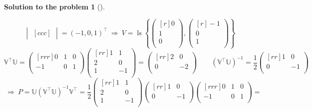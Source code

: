 \documentclass[12pt,a4]{article}
\newtheorem{solution}{Solution to the problem}
\newcommand\ls{\operatorname{ls}}
\newcommand{\bU}{{\mathbb U}}
\newcommand{\bV}{{\mathbb V}}
\begin{document}
{\begin{solution}[]
\begin{enumerate}[(a)]
\[\begin{vmatrix}[ccc]
\end{vmatrix} =
( -1, 0, 1)^\top
~\Rightarrow~ 
V = 
\ls \left \{
\begin{pmatrix}[r]
0\\ 1\\ 0\\
\end{pmatrix},
\begin{pmatrix}[r]
-1 \\ 0 \\ 1 \\
\end{pmatrix}
\right\}
\]
\[
\bV^\top\bU = 
\begin{pmatrix}[rrr]
0 & 1 & 0 \\
-1 & 0 & 1\\
\end{pmatrix}
\begin{pmatrix}[rr]
1 & 1 \\
2 & 0 \\
1 & -1 \\
\end{pmatrix}
= 
\begin{pmatrix}[rr]
2 & 0 \\
0 & -2 \\
\end{pmatrix}
\qquad
(\bV^\top\bU)^{-1} = \frac12
\begin{pmatrix}[rr]
1 & 0 \\
0 & -1 \\
\end{pmatrix}
\]
\[
~ \Rightarrow ~
P = \bU (\bV^\top\bU)^{-1}\bV^\top = \frac12
\begin{pmatrix}[rr]
1 & 1 \\
2 & 0 \\
1 & -1 \\
\end{pmatrix}
\begin{pmatrix}[rr]
1 & 0 \\
0 & -1 \\
\end{pmatrix}
\begin{pmatrix}[rrr]
0 & 1 & 0 \\
-1 & 0 & 1\\
\end{pmatrix} =
\]
\end{enumerate}
\end{solution}}
\end{document}
